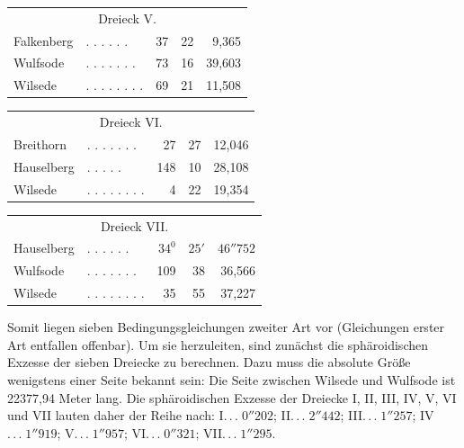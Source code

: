 \begin{center}
\begin{tabular}{l l r r r}
\multicolumn{5}{c}{Dreieck V.}\\[5pt]
Falkenberg&. . . . . .&37&22&9,365\\
Wulfsode&. . . . . . .&73&16&39,603\\
Wilsede&. . . . . . . .&69&21&11,508
\end{tabular}
\end{center}
\begin{center}
\begin{tabular}{l l r r r}
\multicolumn{5}{c}{Dreieck VI.}\\[5pt]
Breithorn&. . . . . . .&27&27&12,046\\
Hauselberg&. . . . \hspace{.5em} .&148&10&28,108\\
Wilsede&. . . . . . . .&4&22&19,354
\end{tabular}
\end{center}
\begin{center}
\begin{tabular}{l l r r r}
\multicolumn{5}{c}{Dreieck VII.}\\[5pt]
Hauselberg&. . . . . .&\(34^0\)&\(25'\)&\(46''752\)\\
Wulfsode&. . . . . . .&109&38&36,566\\
Wilsede&. . . . . . . .&35&55&37,227
\end{tabular}
\end{center}

Somit liegen sieben Bedingungsgleichungen zweiter Art vor (Gleichungen erster Art entfallen offenbar). Um sie herzuleiten, sind zunächst die sphäroidischen Exzesse der sieben Dreiecke zu berechnen. Dazu muss die absolute Größe wenigstens einer Seite bekannt sein: Die Seite zwischen Wilsede und Wulfsode ist 22377,94 Meter lang. Die sphäroidischen Exzesse der Dreiecke I, II, III, IV, V, VI und VII lauten daher der Reihe nach: I\(.\,.\,.\;0''202\); II\(.\,.\,.\;2''442\); III\(.\,.\,.\;1''257\); IV\(.\,.\,.\;1''919\); V\(.\,.\,.\;1''957\); VI\(.\,.\,.\;0''321\); VII\(.\,.\,.\;1''295\).

